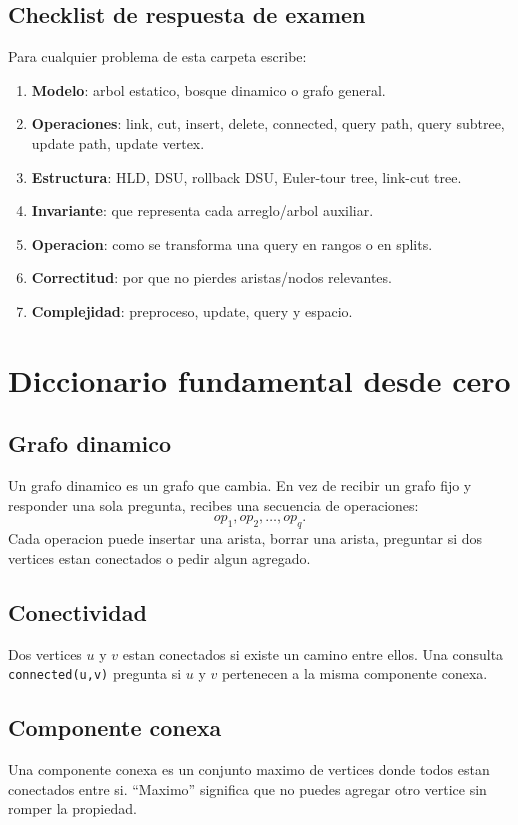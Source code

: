\documentclass[10pt]{article}
\begin{document}
\subsection{Checklist de respuesta de examen}
Para cualquier problema de esta carpeta escribe:
\begin{enumerate}[leftmargin=*]
\item \textbf{Modelo}: arbol estatico, bosque dinamico o grafo general.
\item \textbf{Operaciones}: link, cut, insert, delete, connected, query path,
query subtree, update path, update vertex.
\item \textbf{Estructura}: HLD, DSU, rollback DSU, Euler-tour tree, link-cut tree.
\item \textbf{Invariante}: que representa cada arreglo/arbol auxiliar.
\item \textbf{Operacion}: como se transforma una query en rangos o en splits.
\item \textbf{Correctitud}: por que no pierdes aristas/nodos relevantes.
\item \textbf{Complejidad}: preproceso, update, query y espacio.
\end{enumerate}

\newpage
\section{Diccionario fundamental desde cero}

\subsection{Grafo dinamico}
Un grafo dinamico es un grafo que cambia. En vez de recibir un grafo fijo y
responder una sola pregunta, recibes una secuencia de operaciones:
\[
op_1, op_2, \ldots, op_q.
\]
Cada operacion puede insertar una arista, borrar una arista, preguntar si dos
vertices estan conectados o pedir algun agregado.

\subsection{Conectividad}
Dos vertices $u$ y $v$ estan conectados si existe un camino entre ellos. Una
consulta \texttt{connected(u,v)} pregunta si $u$ y $v$ pertenecen a la misma
componente conexa.

\subsection{Componente conexa}
Una componente conexa es un conjunto maximo de vertices donde todos estan
conectados entre si. ``Maximo'' significa que no puedes agregar otro vertice sin
romper la propiedad.
\end{document}
